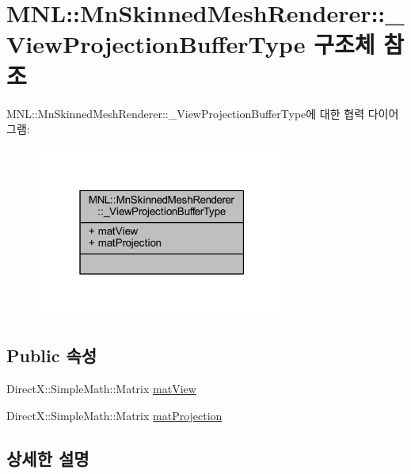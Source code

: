 \hypertarget{struct_m_n_l_1_1_mn_skinned_mesh_renderer_1_1___view_projection_buffer_type}{}\section{M\+NL\+:\+:Mn\+Skinned\+Mesh\+Renderer\+:\+:\+\_\+\+View\+Projection\+Buffer\+Type 구조체 참조}
\label{struct_m_n_l_1_1_mn_skinned_mesh_renderer_1_1___view_projection_buffer_type}


M\+NL\+:\+:Mn\+Skinned\+Mesh\+Renderer\+:\+:\+\_\+\+View\+Projection\+Buffer\+Type에 대한 협력 다이어그램\+:\nopagebreak
\begin{figure}[H]
\begin{center}
\leavevmode
\includegraphics[width=235pt]{struct_m_n_l_1_1_mn_skinned_mesh_renderer_1_1___view_projection_buffer_type__coll__graph}
\end{center}
\end{figure}
\subsection*{Public 속성}
\begin{DoxyCompactItemize}
\item 
Direct\+X\+::\+Simple\+Math\+::\+Matrix \hyperlink{struct_m_n_l_1_1_mn_skinned_mesh_renderer_1_1___view_projection_buffer_type_a4bbebb4a794c138473e5ff50b62e1612}{mat\+View}
\item 
Direct\+X\+::\+Simple\+Math\+::\+Matrix \hyperlink{struct_m_n_l_1_1_mn_skinned_mesh_renderer_1_1___view_projection_buffer_type_abda3cf268206ff65417df2181bd08922}{mat\+Projection}
\end{DoxyCompactItemize}


\subsection{상세한 설명}


